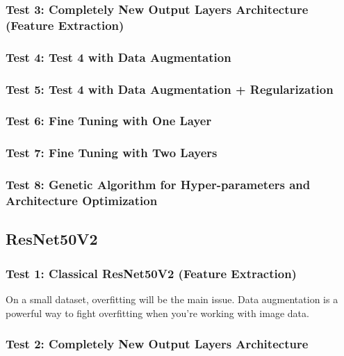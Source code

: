 \subsubsection{Test 3: Completely New Output Layers Architecture (Feature Extraction)}

\subsubsection{Test 4: Test 4 with Data Augmentation}

\subsubsection{Test 5: Test 4 with Data Augmentation + Regularization}

\subsubsection{Test 6: Fine Tuning with One Layer}

\subsubsection{Test 7: Fine Tuning with Two Layers}

\subsubsection{Test 8: Genetic Algorithm for Hyper-parameters and Architecture Optimization}





\subsection{ResNet50V2}

\subsubsection{Test 1: Classical ResNet50V2 (Feature Extraction)}
On a small dataset, overfitting will be the main issue. Data augmentation is a powerful way to fight overfitting when you’re working with image data.

\subsubsection{Test 2: Completely New Output Layers Architecture}

